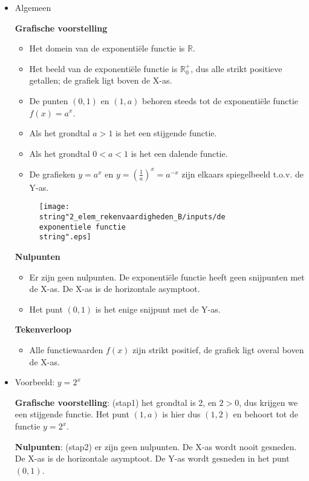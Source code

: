 \begin{itemize}
\item{Algemeen}

\noindent \textbf{Grafische voorstelling}
\begin{itemize}
	\item Het domein van de exponenti\"ele functie is $\mathbb{R}$.
	\item Het beeld van de exponenti\"ele functie is ${\displaystyle \mathbb{R}}_{0}^{+}$,
	dus alle strikt positieve getallen; de grafiek ligt boven de X-as.
	\item De punten $(0,1)$ en $(1,a)$ behoren steeds tot de exponenti\"ele
	functie ${\displaystyle f(x)=a^{x}}$.
	\item Als het grondtal $a>1$ is het een stijgende functie.
	\item Als het grondtal $0<a<1$ is het een dalende functie.
	\item De grafieken ${\displaystyle y=a^{x}}$ en ${\displaystyle y=\left(\frac{1}{a}\right)^{x}=a^{-x}}$
	zijn elkaars spiegelbeeld t.o.v. de Y-as.
\end{itemize}
\begin{figure}
	\centering
	\texttt{[image: \\string"2\_elem\_rekenvaardigheden\_B/inputs/de exponentiele functie\\string".eps]}
\end{figure}


\noindent \textbf{Nulpunten}
\begin{itemize}
	\item Er zijn geen nulpunten. De exponenti\"ele functie heeft geen snijpunten
	met de X-as. De X-as is de horizontale asymptoot.
	\item Het punt $(0,1)$ is het enige snijpunt met de Y-as.
\end{itemize}
\noindent \textbf{Tekenverloop}
\begin{itemize}
	\item Alle functiewaarden $f(x)$ zijn strikt positief, de grafiek ligt
	overal boven de X-as.
\end{itemize}

\item{Voorbeeld: ${\displaystyle y=2^{x}}$}

\textbf{Grafische voorstelling}: (stap1) het grondtal is 2, en $2>0$,
dus krijgen we een stijgende functie. Het punt $(1,a)$ is hier dus
$(1,2)$ en behoort tot de functie ${\displaystyle y=2^{x}}$.\medskip{}


\noindent \textbf{Nulpunten}: (stap2) er zijn geen nulpunten. De X-as
wordt nooit gesneden. De X-as is de horizontale asymptoot. De Y-as
wordt gesneden in het punt $(0,1)$.\medskip{}



\end{itemize}
